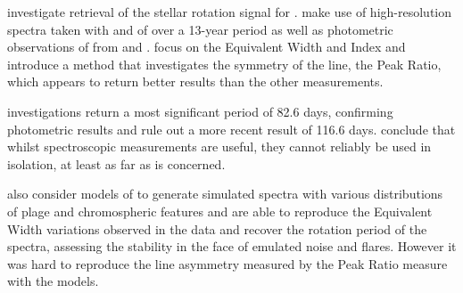 {\FirstP} investigate retrieval of the stellar rotation signal for {\prox}. {\FirstP} make use of high-resolution
spectra taken with {\uves} and {\harps} of {\prox} over a 13-year period as well as photometric observations of
{\prox} from {\asas} and {\hst}. {\FirstP} focus on the {\ha} Equivalent Width and {\ha} Index and introduce a method
that investigates the symmetry of the line, the Peak Ratio, which appears to return better results than the other
measurements.

{\FirstPoss} investigations return a most significant period of 82.6 days, confirming photometric
results and rule out a more recent result of 116.6 days. {\FirstP} conclude that whilst spectroscopic measurements are
useful, they cannot reliably be used in isolation, at least as far as {\prox} is concerned.

{\FirstP} also consider
models of {\prox} to generate simulated spectra with various distributions of plage and chromospheric features and are
able to reproduce the Equivalent Width variations observed in the {\harps} data and recover the rotation period of the
spectra, assessing the stability in the face of emulated noise and flares. However it was hard to reproduce the line
asymmetry measured by the Peak Ratio measure with the models.
